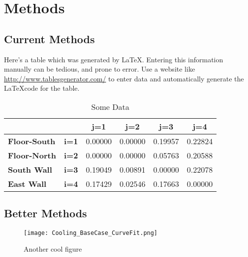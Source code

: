 \chapter{Methods}
\label{ch:Methods}

\section{Current Methods}

Here's a table which was generated by \LaTeX. Entering this information manually can be tedious, and prone to error. Use a website like \url{http://www.tablesgenerator.com/} to enter data and automatically generate the \LaTeX code for the table.

\begin{table}[h]
\centering
\caption{Some Data}
\label{tab:data}
\begin{tabular}{|l|c|c|c|c|c|}
\hline
                     &              & \textbf{j=1} & \textbf{j=2} & \textbf{j=3} & \textbf{j=4} \\ \hline
\textbf{Floor-South} & \textbf{i=1} & 0.00000      & 0.00000      & 0.19957      & 0.22824      \\ \hline
\textbf{Floor-North} & \textbf{i=2} & 0.00000      & 0.00000      & 0.05763      & 0.20588      \\ \hline
\textbf{South Wall}  & \textbf{i=3} & 0.19049      & 0.00891      & 0.00000      & 0.22078      \\ \hline
\textbf{East Wall}   & \textbf{i=4} & 0.17429      & 0.02546      & 0.17663      & 0.00000      \\ \hline
\end{tabular}
\end{table}

\section{Better Methods}

\lipsum[1]

\begin{figure}
    \centering
    \texttt{[image: Cooling\_BaseCase\_CurveFit.png]}
    \caption{Another cool figure}
    \label{fig:another cool figure}
\end{figure}
